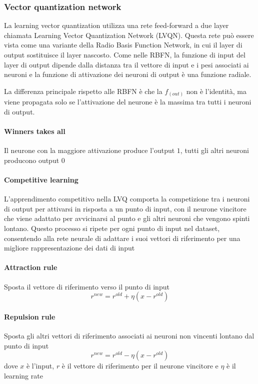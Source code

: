 \subsubsection{Vector quantization network}
La learning vector quantization utilizza una rete feed-forward a due layer chiamata Learning Vector Quantization Network (LVQN). Questa rete può essere vista come una variante della Radio Basis Function Network, in cui il layer di output sostituisce il layer nascosto. Come nelle RBFN, la funzione di input del layer di output dipende dalla distanza tra il vettore di input e i pesi associati ai neuroni e la funzione di attivazione dei neuroni di output è una funzione radiale. 

La differenza principale rispetto alle RBFN è che la $f_{(out)}$ non è l'identità, ma viene propagata solo se l'attivazione del neurone è la massima tra tutti i neuroni di output. 

\paragraph{Winners takes all}
Il neurone con la maggiore attivazione produce l'output $1$, tutti gli altri neuroni producono output $0$

\paragraph{Competitive learning}
L'apprendimento competitivo nella LVQ comporta la competizione tra i neuroni di output per attivarsi in risposta a un punto di input, con il neurone vincitore che viene adattato per avvicinarsi al punto e gli altri neuroni che vengono spinti lontano. Questo processo si ripete per ogni punto di input nel dataset, consentendo alla rete neurale di adattare i suoi vettori di riferimento per una migliore rappresentazione dei dati di input

\paragraph{Attraction rule}
Sposta il vettore di riferimento verso il punto di input
$$r^{new} = r^{old} + \eta(x - r^{old})$$

\paragraph{Repulsion rule}
Sposta gli altri vettori di riferimento associati ai neuroni non vincenti lontano dal punto di input
$$r^{new} = r^{old} - \eta(x - r^{old})$$
dove $x$ è l’input, $r$ è il vettore di riferimento per il neurone vincitore e $\eta$ è il learning rate

